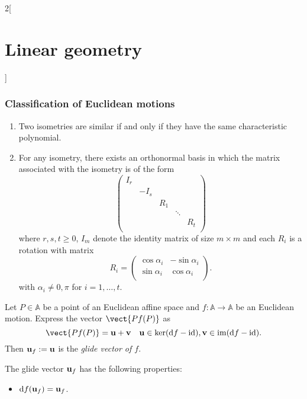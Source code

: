 \documentclass[../../../main.tex]{subfiles}
\begin{document}
\begin{multicols}{2}[\section{Linear geometry}]
  \subsubsection{Classification of Euclidean motions}
  \begin{theorem}
    \hfill
    \begin{enumerate}
      \item Two isometries are similar if and only if they have the same characteristic polynomial.
      \item For any isometry, there exists an orthonormal basis in which the matrix associated with the isometry is of the form  $$\begin{pmatrix}
                I_r &      &     &        &     \\
                    & -I_s &     &        &     \\
                    &      & R_1 &        &     \\
                    &      &     & \ddots &     \\
                    &      &     &        & R_t \\
              \end{pmatrix}$$ where $r,s,t\geq 0$, $I_m$ denote the identity matrix of size $m\times m$ and each $R_i$ is a rotation with matrix $$R_i=\begin{pmatrix}
                \cos\alpha_i & -\sin\alpha_i \\
                \sin\alpha_i & \cos\alpha_i  \\
              \end{pmatrix}.$$ with $\alpha_i\ne0,\pi$ for $i=1,\ldots,t$.
    \end{enumerate}
  \end{theorem}
  \begin{definition}
    Let $P\in\mathbb{A}$ be a point of an Euclidean affine space and $f:\mathbb{A}\rightarrow\mathbb{A}$ be an Euclidean motion. Express the vector $\vect{Pf(P)}$ as $$\vect{Pf(P)}=\vectorfunction{u}+\vectorfunction{v}\quad\vectorfunction{u}\in\ker(\dd f-\id),\vectorfunction{v}\in\im(\dd f-\id).$$ Then $\boldsymbol{\mathrm{u}}_f:=\boldsymbol{\mathrm{u}}$ is the \textit{glide vector of $f$}.
  \end{definition}
  \begin{prop}
    The glide vector $\boldsymbol{\mathrm{u}}_f$ has the following properties:
    \begin{itemize}
      \item $\dd f(\boldsymbol{\mathrm{u}}_f)=\boldsymbol{\mathrm{u}}_f$.

\end{itemize}
\end{prop}
\end{multicols}
\end{document}

